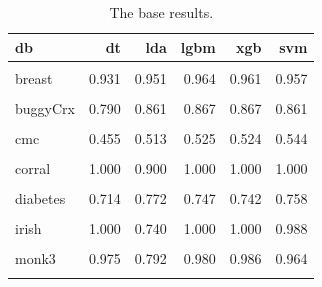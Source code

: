 \documentclass[twoside,11pt,preprint]{article}
\begin{document}
\begin{table}

\caption{\label{tab:xsstab1}\label{tab:sstab1}The base results.}
\centering
\begin{tabular}[t]{lrrrrr}
\toprule
\textbf{db} & \textbf{dt} & \textbf{lda} & \textbf{lgbm} & \textbf{xgb} & \textbf{svm}\\
\midrule
\cellcolor{gray!6}{biomed} & \cellcolor{gray!6}{0.837} & \cellcolor{gray!6}{0.842} & \cellcolor{gray!6}{0.876} & \cellcolor{gray!6}{0.890} & \cellcolor{gray!6}{0.886}\\
breast & 0.931 & 0.951 & 0.964 & 0.961 & 0.957\\
\cellcolor{gray!6}{breast\_w} & \cellcolor{gray!6}{0.940} & \cellcolor{gray!6}{0.950} & \cellcolor{gray!6}{0.961} & \cellcolor{gray!6}{0.961} & \cellcolor{gray!6}{0.961}\\
buggyCrx & 0.790 & 0.861 & 0.867 & 0.867 & 0.861\\
\cellcolor{gray!6}{clean1} & \cellcolor{gray!6}{1.000} & \cellcolor{gray!6}{1.000} & \cellcolor{gray!6}{1.000} & \cellcolor{gray!6}{1.000} & \cellcolor{gray!6}{0.968}\\
\addlinespace
cmc & 0.455 & 0.513 & 0.525 & 0.524 & 0.544\\
\cellcolor{gray!6}{colic} & \cellcolor{gray!6}{0.761} & \cellcolor{gray!6}{0.837} & \cellcolor{gray!6}{0.815} & \cellcolor{gray!6}{0.815} & \cellcolor{gray!6}{0.641}\\
corral & 1.000 & 0.900 & 1.000 & 1.000 & 1.000\\
\cellcolor{gray!6}{credit\_g} & \cellcolor{gray!6}{0.668} & \cellcolor{gray!6}{0.718} & \cellcolor{gray!6}{0.766} & \cellcolor{gray!6}{0.769} & \cellcolor{gray!6}{0.724}\\
diabetes & 0.714 & 0.772 & 0.747 & 0.742 & 0.758\\
\addlinespace
\cellcolor{gray!6}{ionosphere} & \cellcolor{gray!6}{0.869} & \cellcolor{gray!6}{0.866} & \cellcolor{gray!6}{0.940} & \cellcolor{gray!6}{0.932} & \cellcolor{gray!6}{0.934}\\
irish & 1.000 & 0.740 & 1.000 & 1.000 & 0.988\\
\cellcolor{gray!6}{molecular\_b...y\_promoters} & \cellcolor{gray!6}{0.727} & \cellcolor{gray!6}{0.689} & \cellcolor{gray!6}{0.896} & \cellcolor{gray!6}{0.887} & \cellcolor{gray!6}{0.802}\\
monk3 & 0.975 & 0.792 & 0.980 & 0.986 & 0.964\\
\cellcolor{gray!6}{prnn\_crabs} & \cellcolor{gray!6}{0.880} & \cellcolor{gray!6}{1.000} & \cellcolor{gray!6}{0.950} & \cellcolor{gray!6}{0.935} & \cellcolor{gray!6}{0.960}\\

\end{tabular}
\end{table}
\end{document}
